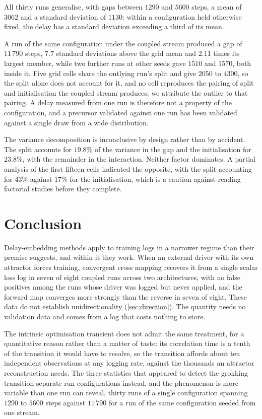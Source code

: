 \documentclass{article}
\begin{document}
All thirty runs generalise, with gaps between $1290$ and $5600$ steps, a mean of $3062$ and
a standard deviation of $1130$: within a configuration held otherwise fixed, the delay has
a standard deviation exceeding a third of its mean.

A run of the same configuration under the coupled stream produced a gap of $11\,790$ steps,
$7.7$ standard deviations above the grid mean and $2.11$ times its largest member, while
two further runs at other seeds gave $1510$ and $1570$, both inside it. Five grid cells
share the outlying run's split and give $2050$ to $4300$, so the split alone does not
account for it, and no cell reproduces the pairing of split and initialisation the coupled
stream produces; we attribute the outlier to that pairing. A delay measured from one run is
therefore not a property of the configuration, and a precursor validated against one run
has been validated against a single draw from a wide distribution.

The variance decomposition is inconclusive by design rather than by accident. The split
accounts for $19.8\%$ of the variance in the gap and the initialisation for $23.8\%$, with
the remainder in the interaction. Neither factor dominates. A partial analysis of the first
fifteen cells indicated the opposite, with the split accounting for $43\%$ against $17\%$
for the initialisation, which is a caution against reading factorial studies before they
complete.

\section{Conclusion}\label{sec:concl}

Delay-embedding methods apply to training logs in a narrower regime than their premise
suggests, and within it they work. When an external driver with its own attractor forces
training, convergent cross mapping recovers it from a single scalar loss log in seven of
eight coupled runs across two architectures, with no false positives among the runs whose
driver was logged but never applied, and the forward map converges more strongly than the
reverse in seven of eight. These data do not establish unidirectionality
(\cref{sec:direction}). The quantity needs no validation data and comes from a log that
costs nothing to store.

The intrinsic optimisation transient does not admit the same treatment, for a quantitative
reason rather than a matter of taste: its correlation time is a tenth of the transition it
would have to resolve, so the transition affords about ten independent observations at any
logging rate, against the thousands an attractor reconstruction needs. The three statistics
that appeared to detect the grokking transition separate run configurations instead, and
the phenomenon is more variable than one run can reveal, thirty runs of a single
configuration spanning $1290$ to $5600$ steps against $11\,790$ for a run of the same
configuration seeded from one stream.
\end{document}
